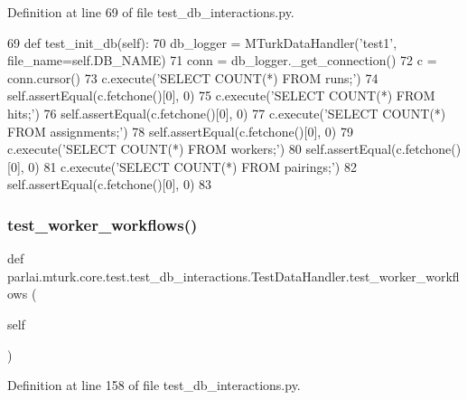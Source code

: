 Definition at line 69 of file test\+\_\+db\+\_\+interactions.\+py.


\begin{DoxyCode}
69     \textcolor{keyword}{def }test\_init\_db(self):
70         db\_logger = MTurkDataHandler(\textcolor{stringliteral}{'test1'}, file\_name=self.DB\_NAME)
71         conn = db\_logger.\_get\_connection()
72         c = conn.cursor()
73         c.execute(\textcolor{stringliteral}{'SELECT COUNT(*) FROM runs;'})
74         self.assertEqual(c.fetchone()[0], 0)
75         c.execute(\textcolor{stringliteral}{'SELECT COUNT(*) FROM hits;'})
76         self.assertEqual(c.fetchone()[0], 0)
77         c.execute(\textcolor{stringliteral}{'SELECT COUNT(*) FROM assignments;'})
78         self.assertEqual(c.fetchone()[0], 0)
79         c.execute(\textcolor{stringliteral}{'SELECT COUNT(*) FROM workers;'})
80         self.assertEqual(c.fetchone()[0], 0)
81         c.execute(\textcolor{stringliteral}{'SELECT COUNT(*) FROM pairings;'})
82         self.assertEqual(c.fetchone()[0], 0)
83 
\end{DoxyCode}
\mbox{\label{classparlai_1_1mturk_1_1core_1_1test_1_1test__db__interactions_1_1TestDataHandler_af40b559a9abdf86a2a62b8cdff096b74}} 
\subsubsection{\texorpdfstring{test\+\_\+worker\+\_\+workflows()}{test\_worker\_workflows()}}
{\footnotesize\ttfamily def parlai.\+mturk.\+core.\+test.\+test\+\_\+db\+\_\+interactions.\+Test\+Data\+Handler.\+test\+\_\+worker\+\_\+workflows (\begin{DoxyParamCaption}\item[{}]{self }\end{DoxyParamCaption})}



Definition at line 158 of file test\+\_\+db\+\_\+interactions.\+py.


